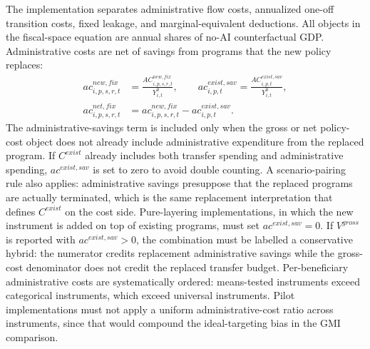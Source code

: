 \documentclass[11pt,a4paper]{article}
\begin{document}
The implementation separates administrative flow costs, annualized one-off transition costs, fixed leakage, and marginal-equivalent deductions. All objects in the fiscal-space equation are annual shares of no-AI counterfactual GDP. Administrative costs are net of savings from programs that the new policy replaces:
\begin{equation}\label{eq:admin_net_costs_v21}
\begin{split}
    ac^{new,fix}_{i,p,s,r,t}&=\frac{AC^{new,fix}_{i,p,s,r,t}}{Y^0_{i,t}},\qquad
    ac^{exist,sav}_{i,p,t}=\frac{AC^{exist,sav}_{i,p,t}}{Y^0_{i,t}},\\
    ac^{net,fix}_{i,p,s,r,t}&=ac^{new,fix}_{i,p,s,r,t}-ac^{exist,sav}_{i,p,t}.
\end{split}
\end{equation}
The administrative-savings term is included only when the gross or net policy-cost object does not already include administrative expenditure from the replaced program. If $C^{exist}$ already includes both transfer spending and administrative spending, $ac^{exist,sav}$ is set to zero to avoid double counting. A scenario-pairing rule also applies: administrative savings presuppose that the replaced programs are actually terminated, which is the same replacement interpretation that defines $C^{exist}$ on the cost side. Pure-layering implementations, in which the new instrument is added on top of existing programs, must set $ac^{exist,sav}=0$. If $V^{gross}$ is reported with $ac^{exist,sav}>0$, the combination must be labelled a conservative hybrid: the numerator credits replacement administrative savings while the gross-cost denominator does not credit the replaced transfer budget.
Per-beneficiary administrative costs are systematically ordered: means-tested instruments exceed categorical instruments, which exceed universal instruments. Pilot implementations must not apply a uniform administrative-cost ratio across instruments, since that would compound the ideal-targeting bias in the GMI comparison.
\end{document}
